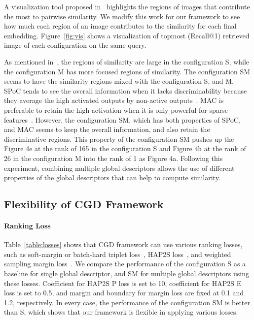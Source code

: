 \documentclass[10pt,twocolumn,letterpaper]{article}
\begin{document}
\begin{CJK}{UTF8}{mj}
A visualization tool proposed in~\cite{stylianouSimVis2019} highlights the regions of images that contribute the most to pairwise similarity.
We modify this work for our framework to see how much each region of an image contributes to the similarity for each final embedding.
Figure~\ref{fig:vis} shows a visualization of topmost (Recall@1) retrieved image of each configuration on the same query.

As mentioned in~\cite{stylianouSimVis2019}, the regions of similarity are large in the configuration S, while the configuration M has more focused regions of similarity.
The configuration SM seems to have the similarity regions mixed with the configuration S, and M.
SPoC tends to see the overall information when it lacks discriminability because they average the high activated outputs by non-active outputs~\cite{hoang2017selective}.
MAC is preferable to retain the high activation when it is only powerful for sparse features~\cite{boureau2010theoretical}.
However, the configuration SM, which has both properties of SPoC, and MAC seems to keep the overall information, and also retain the discriminative regions.
This property of the configuration SM pushes up the Figure {\color{red}4e} at the rank of 165 in the configuration S and Figure {\color{red}4h} at the rank of 26 in the configuration M into the rank of 1 as Figure {\color{red}4a}.
Following this experiment, combining multiple global descriptors allows the use of different properties of the global descriptors that can help to compute similarity.

\subsection{Flexibility of CGD Framework}


\paragraph{Ranking Loss}
Table~\ref{table:losses} shows that CGD framework can use various ranking losses, such as soft-margin or batch-hard triplet loss~\cite{HermansBeyer2017Arxiv}, HAP2S loss~\cite{yu2018hard}, and weighted sampling margin loss~\cite{wu2017sampling}.
We compare the performance of the configuration S as a baseline for single global descriptor, and SM for multiple global descriptors using these losses.
Coefficient  for HAP2S P loss is set to 10, coefficient  for HAP2S E loss is set to 0.5, and margin  and boundary  for margin loss are fixed at 0.1 and 1.2, respectively.
In every case, the performance of the configuration SM is better than S, which shows that our framework is flexible in applying various losses.


\end{CJK}
\end{document}
